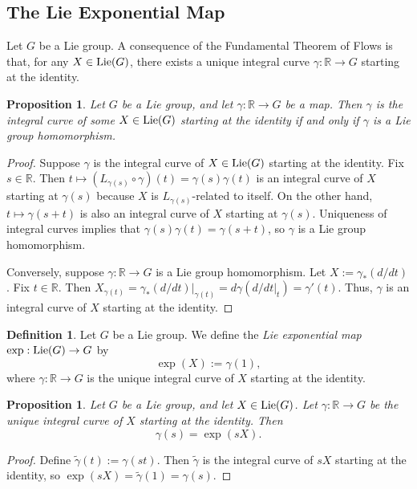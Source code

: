 \documentclass{amsart}[]
\newcommand{\R}{\mathbb R}
\newcommand{\lie}{\text{\normalfont Lie}}
\theoremstyle{plain}
\newtheorem{proposition}[theorem]{Proposition}
\theoremstyle{definition}
\newtheorem{definition}[theorem]{Definition}
\theoremstyle{remark}
\begin{document}
	
	
	\subsection{The Lie Exponential Map}
	Let $G$ be a Lie group. A consequence of the Fundamental Theorem of Flows is that, for any $X \in \lie(G)$, there exists a unique integral curve $\gamma: \R \rightarrow G$ starting at the identity.
	\begin{proposition}
		Let $G$ be a Lie group, and let $\gamma:\R \rightarrow G$ be a map. Then  $\gamma$ is the integral curve of some $X \in \lie(G)$ starting at the identity if and only if $\gamma$ is a Lie group homomorphism.
	\end{proposition}
	\begin{proof}
		Suppose $\gamma$ is the integral curve of $X \in \lie(G)$ starting at the identity. Fix $s \in \R$. Then $t\mapsto (L_{\gamma(s)} \circ \gamma)(t) = \gamma(s)\gamma(t)$ is an integral curve of $X$ starting at $\gamma(s)$ because $X$ is $L_{\gamma(s)}$-related to itself. On the other hand, $t \mapsto \gamma(s+t)$ is also an integral curve of $X$ starting at $\gamma(s)$. Uniqueness of integral curves implies that $\gamma(s) \gamma(t) = \gamma(s+t)$, so $\gamma$ is a Lie group homomorphism.
		
		Conversely, suppose $\gamma: \R \rightarrow G$ is a Lie group homomorphism. Let $X := \gamma_*(d/dt)$. Fix $t \in \R$. Then $X_{\gamma(t)} = \gamma_*(d/dt)|_{\gamma(t)} = d\gamma(d/dt|_t) = \gamma'(t)$. Thus, $\gamma$ is an integral curve of $X$ starting at the identity.
	\end{proof}

	\begin{definition}
		Let $G$ be a Lie group. We define the \emph{Lie exponential map}
		$\exp: \lie(G) \rightarrow G$ by $$\exp(X) := \gamma(1),$$
		where $\gamma:\R \rightarrow G$ is the unique integral curve of $X$ starting at the identity.
	\end{definition}

	\begin{proposition}
		Let $G$ be a Lie group, and let $X \in \lie(G)$. Let $\gamma:\R \rightarrow G$ be the unique integral curve of $X$ starting at the identity. Then 
		$$\gamma(s) = \exp(sX).$$
	\end{proposition}
	\begin{proof}
		Define $\widetilde \gamma(t) := \gamma(st)$. Then $\widetilde \gamma$ is the integral curve of $sX$ starting at the identity, so $\exp(sX) = \widetilde \gamma(1) = \gamma(s)$.
	\end{proof}
\end{document}
